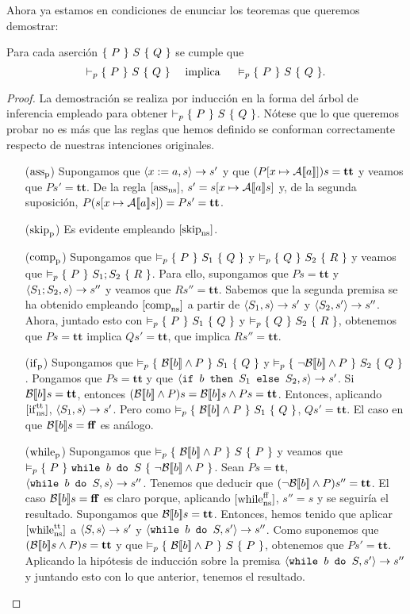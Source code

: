 Ahora ya estamos en condiciones de enunciar los teoremas que queremos demostrar:

\begin{theorem}[De corrección]
Para cada aserción $\{\, \, P \, \, \}\, \, S\, \, \{ \, \, Q \, \, \}$ se cumple que 
$$\vdash_p \{\, \, P \, \, \}\, \, S\, \, \{ \, \, Q \, \, \}\quad \text{ implica }\quad\vDash_p \{\, \, P \, \, \}\, \, S\, \, \{ \, \, Q \, \, \}.$$
\end{theorem}
\begin{proof}
La demostración se realiza por inducción en la forma del árbol de inferencia empleado para obtener $\vdash_p \{\, \, P \, \, \}\, \, S\, \, \{ \, \, Q \, \, \}$. Nótese que lo que queremos probar no es más que las reglas que hemos definido se conforman correctamente respecto de nuestras intenciones originales.
\begin{itemize}
    \item[($\mathrm{ass}_{\mathrm{p}}$)] Supongamos que $\langle x:=a, s \rangle\to s'$ y que $(P[x\mapsto \mathcal{A}[\![a]\!]])s = \mathbf{tt}$ y veamos que $Ps' = \mathbf{tt}$. De la regla $[\mathrm{ass}_{\mathrm{ns}}]$, $s' = s[x\mapsto \mathcal{A}[\![a]\!]s]$ y, de la segunda suposición, $P(s[x \mapsto \mathcal{A}[\![a]\!]s]) = Ps' = \mathbf{tt}$.
    \item[($\mathrm{skip}_{\mathrm{p}}$)] Es evidente empleando $[\mathrm{skip}_{\mathrm{ns}}]$.
    \item[($\mathrm{comp}_{\mathrm{p}}$)] Supongamos que $\vDash_p \{\, \, P \, \, \}\, \, S_1\, \, \{ \, \, Q \, \, \}$ y $\vDash_p \{\, \, Q \, \, \}\, \, S_2\, \, \{ \, \, R \, \, \}$ y veamos que $\vDash_p \{\, \, P \, \, \}\, \, S_1;S_2\, \, \{ \, \, R \, \, \}$. Para ello, supongamos que $Ps= \mathbf{tt}$ y $\langle S_1;S_2, s \rangle\to s''$ y veamos que $Rs''= \mathbf{tt}$. Sabemos que la segunda premisa se ha obtenido empleando $[\mathrm{comp}_{\mathrm{ns}}]$ a partir de $\langle S_1, s \rangle\to s'$ y $\langle S_2, s' \rangle\to s''$. Ahora, juntado esto con $\vDash_p \{\, \, P \, \, \}\, \, S_1\, \, \{ \, \, Q \, \, \}$ y $\vDash_p \{\, \, Q \, \, \}\, \, S_2\, \, \{ \, \, R \, \, \}$, obtenemos que $Ps = \mathbf{tt}$ implica $Qs' = \mathbf{tt}$, que implica $Rs'' = \mathbf{tt}$.
    \item[($\mathrm{if}_{\mathrm{p}}$)] Supongamos que $\vDash_p \{\, \, \mathcal{B}[\![b]\!]\land P \, \, \}\, \, S_1\, \, \{ \, \, Q \, \, \}$ y $\vDash_p \{\, \, \neg\mathcal{B}[\![b]\!]\land P \, \, \}\, \, S_2\, \, \{ \, \, Q \, \, \}$. Pongamos que $Ps = \mathbf{tt}$ y que $\langle \texttt{if }b\texttt{ then }S_1\texttt{ else }S_2, s \rangle\to s'$. Si $\mathcal{B}[\![b]\!]s = \mathbf{tt}$, entonces $(\mathcal{B}[\![b]\!]\land P)s = \mathcal{B}[\![b]\!]s \land Ps = \mathbf{tt}$. Entonces, aplicando $[\mathrm{if}_{\mathrm{ns}}^{\mathrm{tt}}]$, $\langle S_1, s \rangle\to s'$. Pero como $\vDash_p \{\, \, \mathcal{B}[\![b]\!]\land P \, \, \}\, \, S_1\, \, \{ \, \, Q \, \, \}$, $Qs' = \mathbf{tt}$. El caso en que $\mathcal{B}[\![b]\!]s = \mathbf{ff}$ es análogo.
    \item[($\mathrm{while}_{\mathrm{p}}$)] Supongamos que $\vDash_p \{\, \, \mathcal{B}[\![b]\!]\land P \, \, \}\, \, S\, \, \{ \, \, P \, \, \}$ y veamos que $\vDash_p \{\, \, P \, \, \}\, \, \texttt{while }b\texttt{ do }S\, \, \{ \, \, \neg\mathcal{B}[\![b]\!]\land P \, \, \}$. Sean $Ps = \mathbf{tt}$, $\langle \texttt{while }b\texttt{ do }S, s \rangle\to s''$. Tenemos que deducir que $(\neg\mathcal{B}[\![b]\!]\land P)s'' = \mathbf{tt}$. El caso $\mathcal{B}[\![b]\!]s = \mathbf{ff}$ es claro porque, aplicando $[\mathrm{while}_{\mathrm{ns}}^{\mathrm{ff}}]$, $s'' = s$ y se seguiría el resultado. Supongamos que $\mathcal{B}[\![b]\!]s = \mathbf{tt}$. Entonces, hemos tenido que aplicar $[\mathrm{while}_{\mathrm{ns}}^{\mathrm{tt}}]$ a $\langle S, s \rangle\to s'$ y $\langle \texttt{while }b\texttt{ do }S, s' \rangle\to s''$. Como suponemos que $(\mathcal{B}[\![b]\!]s \land P)s = \mathbf{tt}$ y que $\vDash_p \{\, \, \mathcal{B}[\![b]\!]\land P \, \, \}\, \, S\, \, \{ \, \, P \, \, \}$, obtenemos que $Ps' = \mathbf{tt}$. Aplicando la hipótesis de inducción sobre la premisa $\langle \texttt{while }b\texttt{ do }S, s' \rangle\to s''$ y juntando esto con lo que anterior, tenemos el resultado.

\end{itemize}
\end{proof}
